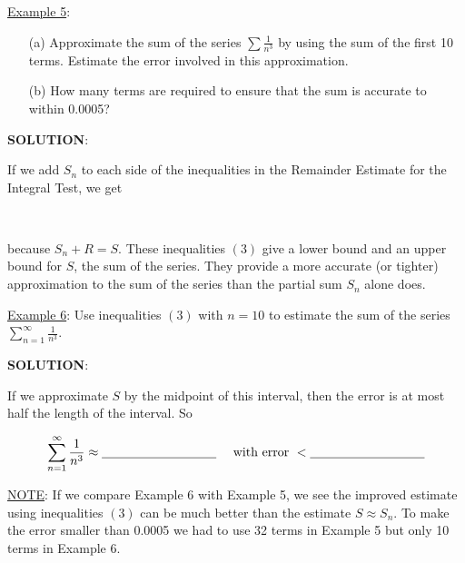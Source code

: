\documentclass[paper=a4, fontsize=11pt]{scrartcl} %
\numberwithin{equation}{section} %
\numberwithin{figure}{section} %
\numberwithin{table}{section} %
\newcommand{\ds}{\displaystyle}
\begin{document}
  \newpage
  \underline{Example 5}:
  \begin{enumerate}
  \item[(a)] Approximate the sum of the series $\ds\sum \ds\frac{1}{n^3}$ by using the sum of the first 10 terms. Estimate the error involved in this approximation.
  \item[(b)] How many terms are required to ensure that the sum is accurate to within 0.0005?
  \end{enumerate}
  \indent
  
  \textbf{SOLUTION}: 
  
  
  \newpage
  
  If we add $S_n$ to each side of the inequalities in the Remainder Estimate for the Integral Test, we get\\
  \indent
  
  \fbox{
  \parbox{\textwidth}{
  \vspace{5pt} 
  \[S_n + \ds\int_{n+1}^\infty f(x)\text{ }dx \leq S \leq S_n + \ds\int_n^\infty f(x)\text{ }dx \hspace{1.5in} (3)\]
  }}
  \indent\\
  \indent
  
  because $S_n + R  = S$. These inequalities $(3)$ give a lower bound and an upper bound for $S$, the sum of the series. They provide a more accurate (or tighter) approximation to the sum of the series than the partial sum $S_n$ alone does.\\
  \indent
  
  \underline{Example 6}: Use inequalities $(3)$ with $n=10$ to estimate the sum of the series $\ds\sum_{n=1}^\infty \ds\frac{1}{n^3}$.\\
  \indent
  
  \textbf{SOLUTION}: \\
  \indent
  
  \vspace{4in}
  
  If we approximate $S$ by the midpoint of this interval, then the error is at most half the length of the interval. So
  
  \[\ds\sum_{n=1}^\infty \ds\frac{1}{n^3} \approx \underline{\hspace{1.25in}} \quad \text{ with error } < \underline{\hspace{1.25in}}\]
  \indent
  
  \underline{NOTE}: If we compare Example 6 with Example 5, we see the improved estimate using inequalities $(3)$ can be much better than the estimate $S\approx S_n$. To make the error smaller than 0.0005 we had to use 32 terms in Example 5 but only 10 terms in Example 6.\\
  \indent
  

\end{document}
